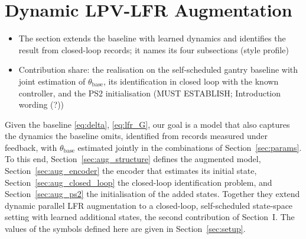 \section{Dynamic LPV-LFR Augmentation}\label{sec:augmentation}
\ifdraft
\begin{itemize}
\item The section extends the baseline with learned dynamics and identifies the result from closed-loop records; it names its four subsections (style profile)
\item Contribution share: the realisation on the self-scheduled gantry baseline with joint estimation of $\theta_{\mathrm{base}}$, its identification in closed loop with the known controller, and the PS2 initialisation (MUST ESTABLISH; Introduction wording (?))
\end{itemize}
\fi

Given the baseline \eqref{eq:delta}, \eqref{eq:lfr_G}, our goal is a model
that also captures the dynamics the baseline omits, identified from records
measured under feedback, with $\theta_{\mathrm{base}}$ estimated jointly in the
combinations of Section~\ref{sec:params}.
To this end, Section~\ref{sec:aug_structure} defines the augmented model,
Section~\ref{sec:aug_encoder} the encoder that estimates its initial state,
Section~\ref{sec:aug_closed_loop} the closed-loop identification problem, and
Section~\ref{sec:aug_ps2} the initialisation of the added states.
Together they extend dynamic parallel LFR augmentation to a closed-loop,
self-scheduled state-space setting with learned additional states, the second
contribution of Section~I.
The values of the symbols defined here are given in Section~\ref{sec:setup}.

